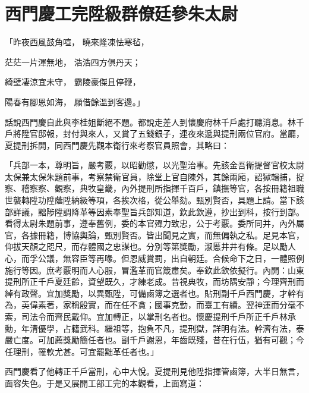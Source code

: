 %

\chapter{西門慶工完陞級\KG 群僚廷參朱太尉}

「昨夜西風鼓角喧，  曉來隆凍怯寒毡，

茫茫一片渾無地，  浩浩四方俱丹天；

綺壁凄涼宜未守，  霸陵豪傑且停鞭，

陽春有腳恩如海，  願借餘溫到客邊。」

話說西門慶自此與李桂姐斷絕不題。都說走差人到懷慶府林千戶處打聽消息。林千戶將陞官邸報，封付與來人，又賞了五錢銀子，連夜來遞與提刑兩位官府。當廳，夏提刑拆開，同西門慶先觀本衛行來考察官員照會，其略曰：

「兵部一本，尊明旨，嚴考覈，以昭勸懲，以光聖治事。先該金吾衛提督官校太尉太保兼太保朱題前事，考察禁衛官員，除堂上官自陳外，其餘兩廂，詔獄輯捕，捉察、稽察察、觀察，典牧皇畿，內外提刑所指揮千百戶，鎮撫等官，各按冊籍祖職世襲轉陞功陞蔭陞納級等項，各挨次格，從公舉劾。甄別賢否，具題上請。當下該部詳議，黜陟陞調降革等因素奉聖旨兵部知道，欽此欽遵，抄出到科，按行到部。看得太尉朱題前事，遵奉舊例，委的本官殫力致忠，公于考覈。委所同并，內外屬官，各據冊籍，博協輿論，甄別賢否。皆出聞見之實，而無偏執之私。足見本官，仰拔天顏之咫尺，而存體國之忠謀也。分別等第獎勵，淑慝井井有條。足以勵人心，而孚公議，無容臣等再喙。但恩威賞罰，出自朝廷。合候命下之日，一體照例施行等因。庶考覈明而人心服，冒濫革而官箴肅矣。奉欽此欽依擬行。內開：山東提刑所正千戶夏廷齡，資望既久，才練老成。昔視典牧，而坊隅安靜；今理齊刑而綽有政聲。宜加獎勵，以異甄陞，可備鹵簿之選者也。貼刑副千戶西門慶，才幹有為，英偉素著，家稱殷實，而在任不貪；國事克勤，而臺工有績。翌神運而分毫不索，司法令而齊民戴仰。宜加轉正，以掌刑名者也。懷慶提刑千戶所正千戶林承勳，年清優學，占籍武科。繼祖等，抱負不凡，提刑獄，詳明有法。幹濟有法，泰嚴亡度。可加薦獎勵簡任者也。副千戶謝恩，年齒既殘，昔在行伍，猶有可觀；今任理刑，罹軟尤甚。可宜罷黜革任者也。」

西門慶看了他轉正千戶當刑，心中大悅。夏提刑見他陞指揮管鹵簿，大半日無言，面容失色。于是又展開工部工完的本觀看，上面寫道：

